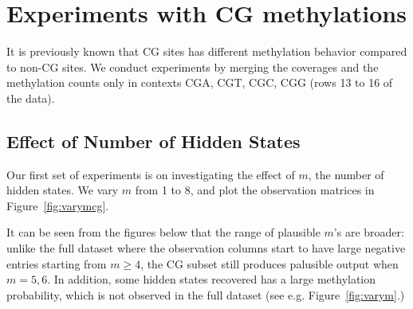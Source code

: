 \documentclass{article}
\begin{document}
\section{Experiments with CG methylations}
It is previously known that CG sites has different methylation behavior
compared to non-CG sites. We conduct experiments by merging the coverages and
the methylation counts only in contexts CGA, CGT, CGC, CGG (rows 13 to 16 of
the data).

\subsection{Effect of Number of Hidden States}
Our first set of experiments is on investigating the effect of $m$, the number of hidden
states. We vary $m$ from 1 to 8, and plot the observation matrices in
Figure~\ref{fig:varymcg}.

It can be seen from the figures below that the range of plausible $m$'s are broader:
unlike the full dataset where the observation columns start to have
large negative entries starting from $m \geq 4$, the CG subset still produces
palusible output when $m = 5,6$. In addition, some hidden states recovered
has a large methylation probability, which is not observed in the full dataset
(see e.g. Figure~\ref{fig:varym}.)
\end{document}
